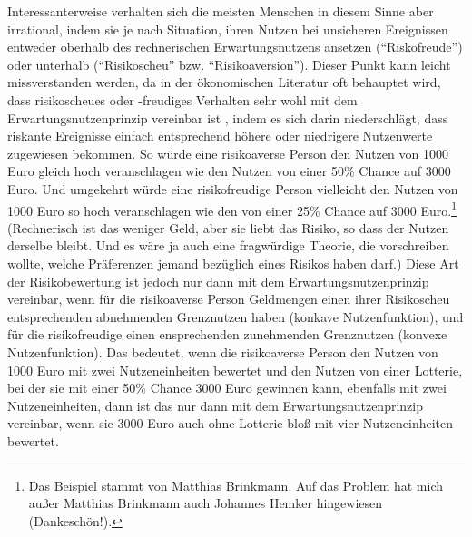 Interessanterweise verhalten sich die meisten Menschen in diesem Sinne aber
\label{RisikoaversionGrenznutzen}
irrational, indem sie je nach Situation, ihren Nutzen bei unsicheren Ereignissen
entweder oberhalb des rechnerischen Erwartungsnutzens ansetzen ("`Riskofreude"')
oder unterhalb ("`Risikoscheu"' bzw. "`Risikoaversion"'). Dieser Punkt kann
leicht missverstanden werden, da in der ökonomischen Literatur oft behauptet
wird, dass risikoscheues oder -freudiges Verhalten sehr wohl mit dem
Erwartungsnutzenprinzip vereinbar ist \cite[S. 103]{osborne:2004}, indem es sich
darin niederschlägt, dass riskante Ereignisse einfach entsprechend höhere oder
niedrigere Nutzenwerte zugewiesen bekommen. So würde eine risikoaverse Person den
Nutzen von 1000 Euro gleich hoch veranschlagen wie den Nutzen von einer 50\%
Chance auf 3000 Euro. Und umgekehrt würde eine risikofreudige Person vielleicht
den Nutzen von 1000 Euro so hoch veranschlagen wie den von einer 25\% Chance auf
3000 Euro.\footnote{Das Beispiel stammt von Matthias Brinkmann. Auf das Problem
hat mich außer Matthias Brinkmann auch Johannes Hemker hingewiesen
(Dankeschön!).} (Rechnerisch ist das weniger Geld, aber sie liebt das Risiko, so
dass der Nutzen derselbe bleibt. Und es wäre ja auch eine fragwürdige Theorie,
die vorschreiben wollte, welche Präferenzen jemand bezüglich eines Risikos haben
darf.) Diese Art der Risikobewertung ist jedoch nur dann mit dem
Erwartungsnutzenprinzip vereinbar, wenn für die risikoaverse Person Geldmengen
einen ihrer Risikoscheu entsprechenden abnehmenden Grenznutzen haben (konkave
Nutzenfunktion), und für die risikofreudige einen ensprechenden zunehmenden
Grenznutzen (konvexe Nutzenfunktion). Das bedeutet, wenn die risikoaverse Person
den Nutzen von 1000 Euro mit zwei Nutzeneinheiten bewertet und den Nutzen von
einer Lotterie, bei der sie mit einer 50\% Chance 3000 Euro gewinnen kann,
ebenfalls mit zwei Nutzeneinheiten, dann ist das nur dann mit dem
Erwartungsnutzenprinzip vereinbar, wenn sie 3000 Euro auch ohne Lotterie bloß
mit vier Nutzeneinheiten bewertet.

